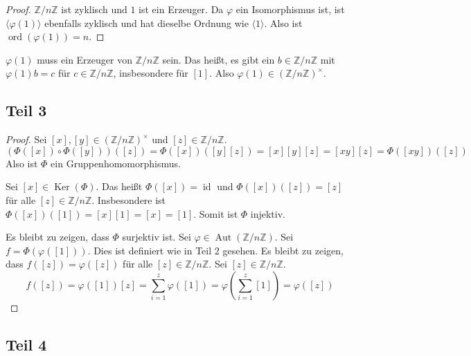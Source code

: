 \documentclass[10pt,a4paper]{article}
\DeclareMathOperator{\id}{id}
\DeclareMathOperator{\ker}{Ker}
\DeclareMathOperator{\ord}{ord}
\DeclareMathOperator{\Aut}{Aut}
\begin{document}
\begin{proof}
  $\mathbb{Z} / n \mathbb{Z}$ ist zyklisch und $1$ ist ein Erzeuger.
  Da $\varphi$ ein Isomorphismus ist, ist $\langle \varphi(1) \rangle$ ebenfalls zyklisch und hat dieselbe Ordnung wie $\langle 1 \rangle$.
  Also ist $\ord(\varphi(1)) = n$.
\end{proof}

$\varphi(1)$ muss ein Erzeuger von $\mathbb{Z} / n \mathbb{Z}$ sein.
Das heißt, es gibt ein $b \in \mathbb{Z} / n \mathbb{Z}$ mit $\varphi(1)b = c$ für $c \in \mathbb{Z} / n \mathbb{Z}$, insbesondere für $[1]$.
Also $\varphi(1) \in (\mathbb{Z} / n \mathbb{Z})^{\times}$.

\subsection{Teil 3}

\begin{proof}
  Sei $[x], [y] \in (\mathbb{Z} / n \mathbb{Z})^{\times}$ und $[z] \in \mathbb{Z} / n \mathbb{Z}$.
  \begin{equation}
    (\varPhi([x]) \circ  \varPhi([y]))([z]) = \varPhi([x])([y][z]) = [x][y][z] = [xy][z] = \varPhi([xy])([z])
  \end{equation}
  Also ist $\varPhi$ ein Gruppenhomomorphismus.

  Sei $[x] \in \ker(\varPhi)$.
  Das heißt $\varPhi([x]) = \id$ und $\varPhi([x])([z]) = [z]$ für alle $[z] \in \mathbb{Z} / n \mathbb{Z}$.
  Insbesondere ist $\varPhi([x])([1]) = [x][1] = [x] = [1]$.
  Somit ist $\varPhi$ injektiv.

  Es bleibt zu zeigen, dass $\varPhi$ surjektiv ist.
  Sei $\varphi \in \Aut(\mathbb{Z} / n \mathbb{Z})$.
  Sei $f = \varPhi(\varphi([1]))$.
  Dies ist definiert wie in Teil 2 gesehen.
  Es bleibt zu zeigen, dass $f([z]) = \varphi([z])$ für alle $[z] \in \mathbb{Z} / n \mathbb{Z}$.
  Sei $[z] \in \mathbb{Z} / n \mathbb{Z}$.
  \begin{equation}
    f([z]) = \varphi([1])[z] = \sum_{i = 1}^{z} \varphi([1]) = \varphi(\sum_{i = 1}^{z} [1]) = \varphi([z])
  \end{equation}
\end{proof}

\subsection{Teil 4}
\end{document}

